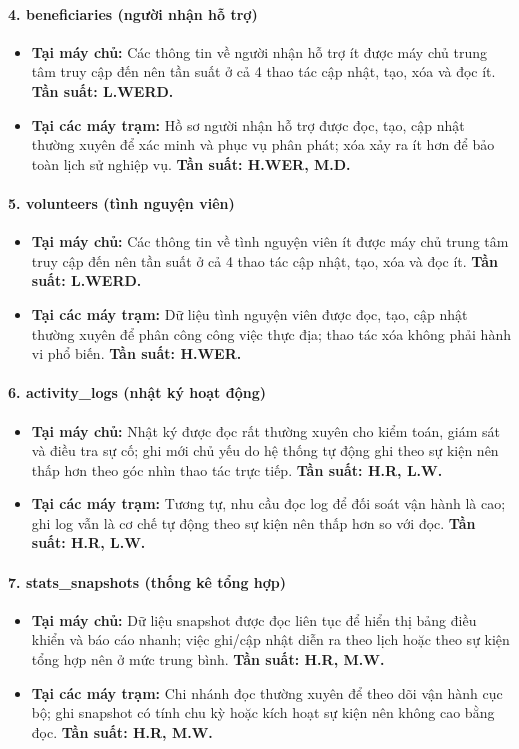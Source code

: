 \documentclass[12pt,a4paper]{article}
\begin{document}
\paragraph{4. beneficiaries (người nhận hỗ trợ)} \mbox{}
\begin{itemize}
    \item \textbf{Tại máy chủ:} Các thông tin về người nhận hỗ trợ ít được máy chủ trung tâm truy cập đến nên tần suất ở cả 4 thao tác cập nhật, tạo, xóa và đọc ít. \textbf{Tần suất: L.WERD.}
    \item \textbf{Tại các máy trạm:} Hồ sơ người nhận hỗ trợ được đọc, tạo, cập nhật thường xuyên để xác minh và phục vụ phân phát; xóa xảy ra ít hơn để bảo toàn lịch sử nghiệp vụ. \textbf{Tần suất: H.WER, M.D.}
\end{itemize}

\paragraph{5. volunteers (tình nguyện viên)} \mbox{}
\begin{itemize}
    \item \textbf{Tại máy chủ:} Các thông tin về tình nguyện viên ít được máy chủ trung tâm truy cập đến nên tần suất ở cả 4 thao tác cập nhật, tạo, xóa và đọc ít. \textbf{Tần suất: L.WERD.}
    \item \textbf{Tại các máy trạm:} Dữ liệu tình nguyện viên được đọc, tạo, cập nhật thường xuyên để phân công công việc thực địa; thao tác xóa không phải hành vi phổ biến. \textbf{Tần suất: H.WER.}
\end{itemize}

\paragraph{6. activity\_logs (nhật ký hoạt động)} \mbox{}
\begin{itemize}
    \item \textbf{Tại máy chủ:} Nhật ký được đọc rất thường xuyên cho kiểm toán, giám sát và điều tra sự cố; ghi mới chủ yếu do hệ thống tự động ghi theo sự kiện nên thấp hơn theo góc nhìn thao tác trực tiếp. \textbf{Tần suất: H.R, L.W.}
    \item \textbf{Tại các máy trạm:} Tương tự, nhu cầu đọc log để đối soát vận hành là cao; ghi log vẫn là cơ chế tự động theo sự kiện nên thấp hơn so với đọc. \textbf{Tần suất: H.R, L.W.}
\end{itemize}

\paragraph{7. stats\_snapshots (thống kê tổng hợp)} \mbox{}
\begin{itemize}
    \item \textbf{Tại máy chủ:} Dữ liệu snapshot được đọc liên tục để hiển thị bảng điều khiển và báo cáo nhanh; việc ghi/cập nhật diễn ra theo lịch hoặc theo sự kiện tổng hợp nên ở mức trung bình. \textbf{Tần suất: H.R, M.W.}
    \item \textbf{Tại các máy trạm:} Chi nhánh đọc thường xuyên để theo dõi vận hành cục bộ; ghi snapshot có tính chu kỳ hoặc kích hoạt sự kiện nên không cao bằng đọc. \textbf{Tần suất: H.R, M.W.}
\end{itemize}
\end{document}
